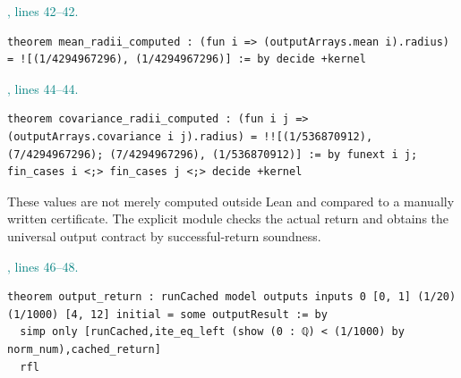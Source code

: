 \documentclass[11pt]{article}\usepackage{needspace}\renewcommand{\paperkind}{Lean companion}\setlength{\parskip}{0.35em}
\begin{document}


{\small\textcolor{teal}{, lines 42--42.}\par}

\begin{lstlisting}[style=BayesSource]
theorem mean_radii_computed : (fun i => (outputArrays.mean i).radius) = ![(1/4294967296), (1/4294967296)] := by decide +kernel
\end{lstlisting}



{\small\textcolor{teal}{, lines 44--44.}\par}

\begin{lstlisting}[style=BayesSource]
theorem covariance_radii_computed : (fun i j => (outputArrays.covariance i j).radius) = !![(1/536870912), (7/4294967296); (7/4294967296), (1/536870912)] := by funext i j; fin_cases i <;> fin_cases j <;> decide +kernel
\end{lstlisting}

These values are not merely computed outside Lean and compared to a manually written certificate. The explicit module checks the actual  return and obtains the universal output contract by successful-return soundness.



{\small\textcolor{teal}{, lines 46--48.}\par}

\begin{lstlisting}[style=BayesSource]
theorem output_return : runCached model outputs inputs 0 [0, 1] (1/20) (1/1000) [4, 12] initial = some outputResult := by
  simp only [runCached,ite_eq_left (show (0 : ℚ) < (1/1000) by norm_num),cached_return]
  rfl
\end{lstlisting}
\end{document}
